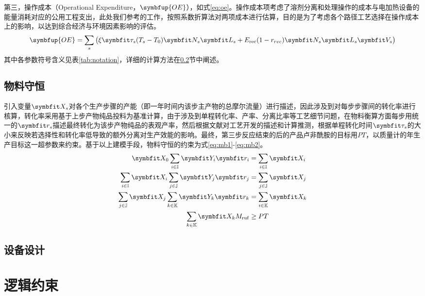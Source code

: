 第三，操作成本（Operational Expenditure，$\symbfup{OE}$），如式\eqref{eq:oe}。操作成本项考虑了溶剂分离和处理操作的成本与电加热设备的能量消耗对应的公用工程支出，此处我们参考\cite{diab2018}的工作，按照系数折算法\cite{garrett2012}对两项成本进行估算，目的是为了考虑各个路径工艺选择在操作成本上的影响，以达到综合经济与环境因素影响的评估。
\begin{align}
  \symbfup{OE} = \sum_s \big(\xi\symbfit\tau_s(T_s-T_0)\symbfit N_s\symbfit L_s +E_{\rm rec}(1-r_{rec})\symbfit N_s\symbfit L_s\symbfit V_s\big) \label{eq:oe}
\end{align}
其中各参数符号含义见表\ref{tab:notation}，详细的计算方法在\ref{section:shebei}节中阐述。

\subsection{物料守恒}

引入变量$\symbfit X_s$对各个生产步骤的产能（即一年时间内该步主产物的总摩尔流量）进行描述，因此涉及到对每步步骤间的转化率进行核算，转化率采用基于上步产物纯品投料为基准计算，由于涉及到单程转化率、产率、分离比率等工艺细节问题，在物料衡算方面每步用统一的$\symbfit r_s$描述最终转化为该步产物纯品的表观产率，然后根据文献对工艺开发的描述和计算推测，根据单程转化时间$\symbfit \tau_s$的大小来反映若选择性和转化率低导致的额外分离对生产效能的影响。最终，第三步反应结束的后的产品卢非酰胺的目标用$PT$，以质量计的年生产目标这一超参数来约束。基于以上建模手段，物料守恒的约束为式\eqref{eq:mb1}-\eqref{eq:mb2}。
\begin{align}
  \symbfit X_0\sum_{i\in\mathbb I}\symbfit Y_i\symbfit r_i&=\sum_{i\in\mathbb I}\symbfit X_i \label{eq:mb1} \\
  \sum_{i\in\mathbb I}\symbfit X_i\sum_{j\in\mathbb J}\symbfit Y_j\symbfit r_j&=\sum_{j\in\mathbb J}\symbfit X_j \\
  \sum_{j\in\mathbb J}\symbfit X_j\sum_{k\in\mathbb K}\symbfit Y_k\symbfit r_k&=\sum_{i\in\mathbb K}\symbfit X_k \\
  \sum_{k\in\mathbb K}\symbfit X_kM_{\rm ruf}&\ge PT \label{eq:mb2}
\end{align}

\subsection{设备设计}
\label{section:shebei}

\section{逻辑约束}

